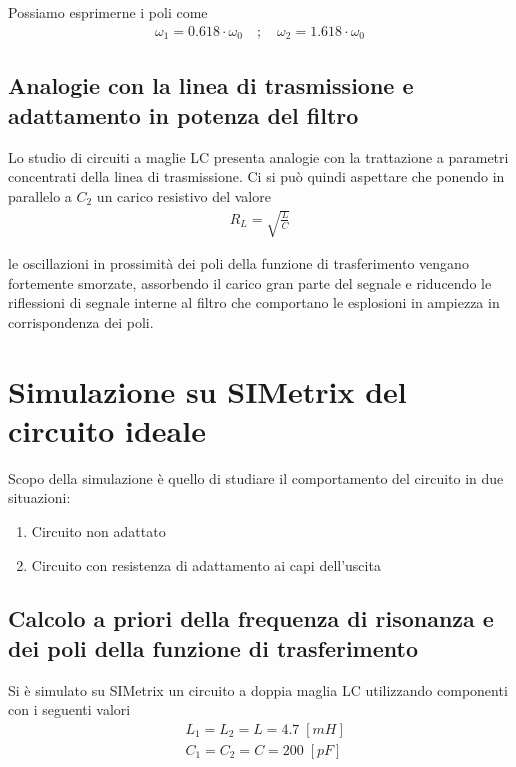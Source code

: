 \documentclass[a4paper,12pt]{report}
\newcommand{\spacer}{\quad ; \quad}
\begin{document}
Possiamo esprimerne i poli come
\begin{align}
\omega_1 = 0.618 \cdot \omega_0 \spacer \omega_2 = 1.618 \cdot \omega_0
\end{align}

\newpage

\subsection{Analogie con la linea di trasmissione e adattamento in potenza del filtro}

Lo studio di circuiti a maglie LC presenta analogie con la trattazione a parametri concentrati della linea di trasmissione. Ci si può quindi aspettare che ponendo in parallelo a $C_2$ un carico resistivo del valore
\begin{align}
R_L = \sqrt{\frac{L}{C}}
\end{align}

le oscillazioni in prossimità dei poli della funzione di trasferimento vengano fortemente smorzate, assorbendo il carico gran parte del segnale e riducendo le riflessioni di segnale interne al filtro che comportano le esplosioni in ampiezza in corrispondenza dei poli.

\section{Simulazione su SIMetrix del circuito ideale}

Scopo della simulazione è quello di studiare il comportamento del circuito in due situazioni:
\begin{enumerate}
\item Circuito non adattato
\item Circuito con resistenza di adattamento ai capi dell'uscita
\end{enumerate}

\subsection{Calcolo a priori della frequenza di risonanza e dei poli della funzione di trasferimento}

Si è simulato su SIMetrix un circuito a doppia maglia LC utilizzando componenti con i seguenti valori
\begin{align}
&L_1 = L_2  = L= 4.7 \; [mH]\\ 
&C _1 = C_2 = C = 200 \; [pF]
\end{align}
\end{document}
